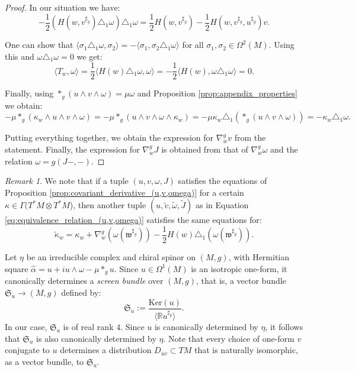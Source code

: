 \documentclass[10pt,a4paper,twoside,reqno]{amsart}
\theoremstyle{plain}
\theoremstyle{definition}
\theoremstyle{remark}
\newtheorem{remark}[thm]{Remark}
\newcommand{\escal}[1]{\langle#1\rangle}
\renewcommand{\ker}{\mathrm{Ker}}
\begin{document}
\begin{proof}
    In our situation we have: $$-\frac{1}{2}(H(w,v^{\sharp_g})\triangle_1\omega)\triangle_1\omega=\frac{1}{2}H(w,v^{\sharp_g})-\frac{1}{2}H(w,v^{\sharp_g},u^{\sharp_g})v.$$

    One can show that $\escal{\sigma_1\triangle_1\omega,\sigma_2}=-\escal{\sigma_1,\sigma_2\triangle_1\omega}$ for all $\sigma_1,\sigma_2\in\Omega^2(M)$. Using this and $\omega\triangle_1\omega=0$ we get: $$\escal{T_w,\omega}=\frac{1}{2}\escal{H(w)\triangle_1\omega,\omega}=-\frac{1}{2}\escal{H(w),\omega\triangle_1\omega}=0.$$
    
    Finally, using $*_g(u\wedge v\wedge\omega)=\mu\omega$ and Proposition \ref{prop:appendix_properties} we obtain: $$-\mu*_g(\kappa_w\wedge u\wedge v\wedge\omega)=-\mu*_g(u\wedge v\wedge\omega\wedge\kappa_w)=-\mu\kappa_w\triangle_1(*_g(u\wedge v\wedge\omega))=-\kappa_w\triangle_1\omega.$$

    Putting everything together, we obtain the expression for $\nabla^g_w v$ from the statement. Finally, the expression for $\nabla^g_wJ$ is obtained from that of $\nabla^g_w\omega$ and the relation $\omega=g(J-,-)$.
\end{proof}

\begin{remark}
We note that if a tuple $(u,v,\omega,J)$ satisfies the equations of Proposition \ref{prop:covariant_derivative_(u,v,omega)} for a certain $\kappa\in \Gamma (T^{\ast} M\otimes T^{\ast}M$), then another tuple $(u,\tilde{v},\tilde{\omega},\tilde{J})$ as in Equation \eqref{eq:equivalence_relation_(u,v,omega)} satisfies the same equations for: $$\tilde{\kappa}_w=\kappa_w+\nabla^g_w(\omega(\mathfrak{w}^{\sharp_g}))-\frac{1}{2}H(w)\triangle_1(\omega(\mathfrak{w}^{\sharp_g})).$$
\end{remark}

Let $\eta$ be an irreducible complex and chiral spinor on $(M,g)$, with Hermitian square $\widehat{\alpha}=u+iu\wedge\omega-\mu*_{g}u$. Since $u\in \Omega^1(M)$ is an isotropic one-form, it canonically determines a \emph{screen bundle} over $(M,g)$, that is, a vector bundle $\mathfrak{S}_u \to (M,g)$ defined by:
\begin{equation*}
\mathfrak{S}_u := \frac{\ker(u)}{\langle \mathbb{R} u^{\sharp_g}\rangle}.
\end{equation*}
In our case, $\mathfrak{S}_u$ is of real rank $4$. Since $u$ is canonically determined by $\eta$, it follows that $\mathfrak{S}_u$ is also canonically determined by $\eta$. Note that every choice of one-form $v$ conjugate to $u$ determines a distribution $D_{uv} \subset TM$ that is naturally isomorphic, as a vector bundle, to $\mathfrak{S}_u$.
\end{document}
